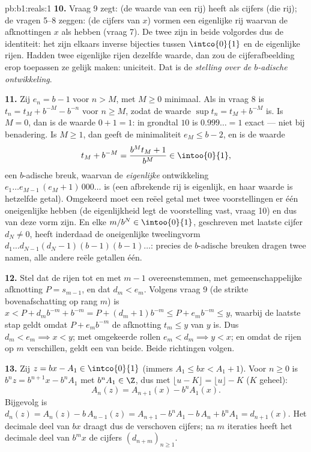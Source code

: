 \begin{solution}{pb:b1:reals:1}
\textbf{10.} Vraag 9 zegt: (de waarde van een rij) heeft als cijfers (die
rij); de vragen 5--8 zeggen: (de cijfers van $x$) vormen een eigenlijke
rij waarvan de afknottingen $x$ als  hebben (vraag 7). De twee
 zijn in beide volgordes dus de identiteit: het zijn elkaars
inverse bijecties tussen $\intco{0}{1}$ en de eigenlijke rijen. Hadden
twee eigenlijke rijen dezelfde waarde, dan zou de cijferafbeelding erop
toepassen ze gelijk maken: uniciteit. Dat is de \emph{stelling over de
$b$-adische ontwikkeling}.

\textbf{11.} Zij $e_n = b - 1$ voor $n > M$, met $M \geq 0$ minimaal. Als
in vraag 8 is $t_n = t_M + b^{-M} - b^{-n}$ voor $n \geq M$, zodat de
waarde $\sup t_n = t_M + b^{-M}$ is. Is $M = 0$, dan is de waarde $0 + 1
= 1$: in grondtal $10$ is $0.999\dots = 1$ exact --- niet bij benadering.
Is $M \geq 1$, dan geeft de minimaliteit $e_M \leq b - 2$, en is de
waarde
\[
t_M + b^{-M} = \frac{b^M t_M + 1}{b^M} \in \intoo{0}{1},
\]
een $b$-adische breuk, waarvan de \emph{eigenlijke} ontwikkeling $e_1
\dots e_{M-1}\,(e_M + 1)\,000\dots$ is (een afbrekende rij is eigenlijk,
en haar waarde is hetzelfde getal). Omgekeerd moet een reëel getal met
twee voorstellingen er één oneigenlijke hebben (de eigenlijkheid legt de
voorstelling vast, vraag 10) en dus van deze vorm zijn. En elke $m/b^N
\in \intoo{0}{1}$, geschreven met laatste cijfer $d_N \neq 0$, heeft
inderdaad de oneigenlijke tweelingvorm $d_1 \dots d_{N-1}(d_N -
1)(b-1)(b-1)\dots$: precies de $b$-adische breuken dragen twee namen,
alle andere reële getallen één.

\textbf{12.} Stel dat de rijen tot en met $m - 1$ overeenstemmen, met
gemeenschappelijke afknotting $P = s_{m-1}$, en dat $d_m < e_m$. Volgens
vraag 9 (de strikte bovenafschatting op rang $m$) is $x < P + d_m b^{-m}
+ b^{-m} = P + (d_m + 1)b^{-m} \leq P + e_m b^{-m} \leq y$, waarbij de
laatste stap geldt omdat $P + e_m b^{-m}$ de afknotting $t_m \leq y$ van
$y$ is. Dus $d_m < e_m \implies x < y$; met omgekeerde rollen $e_m < d_m
\implies y < x$; en omdat de rijen op $m$ verschillen, geldt een van
beide. Beide richtingen volgen.

\textbf{13.} Zij $z = bx - A_1 \in \intco{0}{1}$ (immers $A_1 \leq bx <
A_1 + 1$). Voor $n \geq 0$ is $b^n z = b^{n+1} x - b^n A_1$ met $b^n A_1
\in \Z$, dus met $\lfloor u - K \rfloor = \lfloor u \rfloor - K$ ($K$
geheel):
\[
A_n(z) = A_{n+1}(x) - b^n A_1(x) .
\]
Bijgevolg is $d_n(z) = A_n(z) - b\,A_{n-1}(z) = A_{n+1} - b^n A_1 -
b\,A_n + b^n A_1 = d_{n+1}(x)$. Het decimale deel van $bx$ draagt dus de
verschoven cijfers; na $m$ iteraties heeft het decimale deel van $b^m x$
de cijfers $(d_{n+m})_{n \geq 1}$.


\end{solution}
